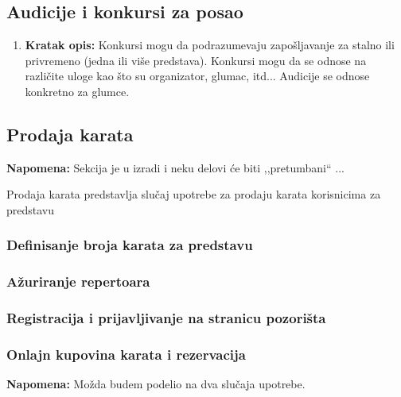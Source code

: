 \documentclass[a4paper]{article}
\begin{document}
\subsection{Audicije i konkursi za posao}
\begin{enumerate}
  \item \textbf{Kratak opis:} Konkursi mogu da podrazumevaju zapošljavanje za stalno ili privremeno
        (jedna ili više predstava). Konkursi mogu da se odnose na različite uloge kao što su
        organizator, glumac, itd... Audicije se odnose konkretno za glumce.
\end{enumerate}
 
\subsection{Prodaja karata}
\textbf{Napomena:} Sekcija je u izradi i neku delovi će biti ,,pretumbani`` ...

Prodaja karata predstavlja slučaj upotrebe za prodaju karata korisnicima za predstavu

\subsubsection{Definisanje broja karata za predstavu}

\subsubsection{Ažuriranje repertoara}

\subsubsection{Registracija i prijavljivanje na stranicu pozorišta}

\subsubsection{Onlajn kupovina karata i rezervacija}

\textbf{Napomena:} Možda budem podelio na dva slučaja upotrebe.
\end{document}
